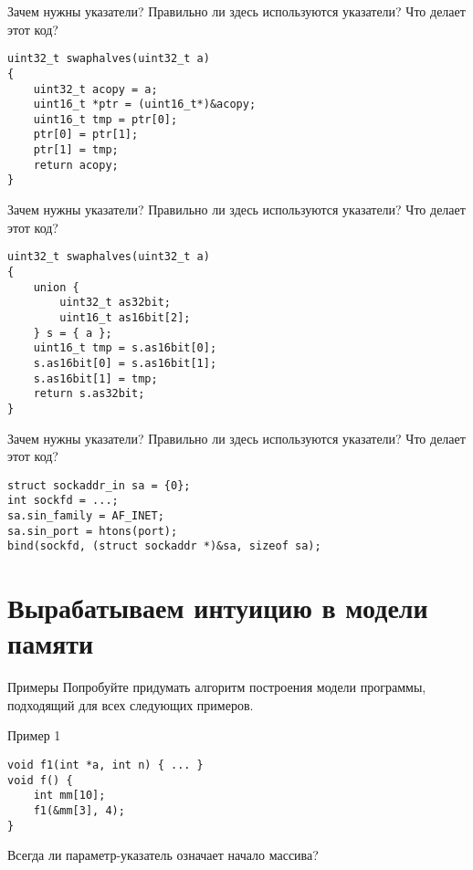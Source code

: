 \documentclass[hyperref={unicode=true}]{beamer}
\begin{document}
    \begin{frame}[fragile]{Зачем нужны указатели?}
    Правильно ли здесь используются указатели?
    Что делает этот код?
    \begin{lstlisting}
uint32_t swaphalves(uint32_t a)
{
    uint32_t acopy = a;
    uint16_t *ptr = (uint16_t*)&acopy;
    uint16_t tmp = ptr[0];
    ptr[0] = ptr[1];
    ptr[1] = tmp;
    return acopy;
}
    \end{lstlisting}
    \end{frame}

    \begin{frame}[fragile]{Зачем нужны указатели?}
    Правильно ли здесь используются указатели?
    Что делает этот код?
    \begin{lstlisting}
uint32_t swaphalves(uint32_t a)
{
    union {
        uint32_t as32bit;
        uint16_t as16bit[2];
    } s = { a };
    uint16_t tmp = s.as16bit[0];
    s.as16bit[0] = s.as16bit[1];
    s.as16bit[1] = tmp;
    return s.as32bit;
}
\end{lstlisting}
    \end{frame}

    \begin{frame}[fragile]{Зачем нужны указатели?}
    Правильно ли здесь используются указатели?
    Что делает этот код?
    \begin{lstlisting}
struct sockaddr_in sa = {0};
int sockfd = ...;
sa.sin_family = AF_INET;
sa.sin_port = htons(port);
bind(sockfd, (struct sockaddr *)&sa, sizeof sa);
    \end{lstlisting}
    \end{frame}
\fi
    \section{Вырабатываем интуицию в модели памяти}

    \begin{frame}{Примеры}
    Попробуйте придумать алгоритм построения модели
    программы, подходящий для всех следующих примеров.
    \end{frame}

    \begin{frame}[fragile]{Пример 1}
    \begin{lstlisting}
void f1(int *a, int n) { ... }
void f() {
    int mm[10];
    f1(&mm[3], 4);
}
    \end{lstlisting}
    Всегда ли параметр-указатель означает начало массива?
    \end{frame}
\end{document}
